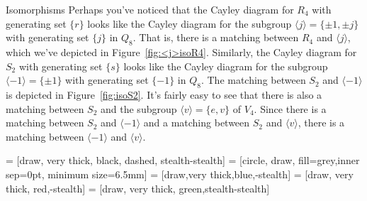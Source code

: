\begin{section}{Isomorphisms}
Perhaps you've noticed that the Cayley diagram for $R_4$ with generating set $\{r\}$ looks like the Cayley diagram for the subgroup $\langle j\rangle=\{\pm 1,\pm j\}$ with generating set $\{j\}$ in $Q_8$.  That is, there is a matching between $R_4$ and $\langle j\rangle$, which we've depicted in Figure~\ref{fig:<j>isoR4}. Similarly, the Cayley diagram for $S_2$ with generating set $\{s\}$ looks like the Cayley diagram for the subgroup $\langle -1\rangle=\{\pm 1\}$ with generating set $\{-1\}$ in $Q_8$.  The matching between $S_2$ and $\langle -1\rangle$ is depicted in Figure~\ref{fig:isoS2}.  It's fairly easy to see that there is also a matching between $S_2$ and the subgroup $\langle v\rangle =\{e,v\}$ of $V_4$.  Since there is a matching between $S_2$ and $\langle -1\rangle$ and a matching between $S_2$ and $\langle v\rangle$, there is a matching between $\langle -1\rangle$ and $\langle v\rangle$.

 = [draw, very thick, black, dashed, stealth-stealth]
 = [circle, draw, fill=grey,inner sep=0pt, minimum size=6.5mm]
 = [draw,very thick,blue,-stealth]
 = [draw, very thick, red,-stealth]
 = [draw, very thick, green,stealth-stealth]

\begin{figure}[!ht]
\centering
{}
\end{figure}
\end{section}
